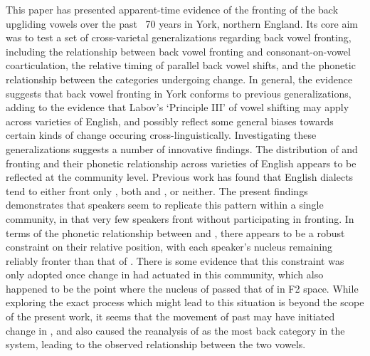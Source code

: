 \documentclass[12pt]{article}
\begin{document}
This paper has presented apparent-time evidence of the fronting of the back upgliding vowels over the past ~70 years in York, northern England. Its core aim was to test a set of cross-varietal generalizations regarding back vowel fronting, including the relationship between back vowel fronting and consonant-on-vowel coarticulation, the relative timing of parallel back vowel shifts, and the phonetic relationship between the categories undergoing change. In general, the evidence suggests that back vowel fronting in York conforms to previous generalizations, adding to the evidence that Labov's `Principle III' of vowel shifting may apply across varieties of English, and possibly reflect some general biases towards certain kinds of change occuring cross-linguistically. Investigating these generalizations suggests a number of innovative findings. The distribution of  and  fronting and their phonetic relationship across varieties of English appears to be reflected at the community level. Previous work has found that English dialects tend to either front only , both  and , or neither. The present findings demonstrates that speakers seem to replicate this pattern within a single community, in that very few speakers front  without participating in  fronting. In terms of the phonetic relationship between  and , there appears to be a robust constraint on their relative position, with each speaker's  nucleus remaining reliably fronter than that of . There is some evidence that this constraint was only adopted once change in  had actuated in this community, which also happened to be the point where the nucleus of  passed that of  in F2 space. While exploring the exact process which might lead to this situation is beyond the scope of the present work, it seems that the movement of  past  may have initiated change in , and also caused the reanalysis of  as the most back category in the system, leading to the observed relationship between the two vowels.
\end{document}
